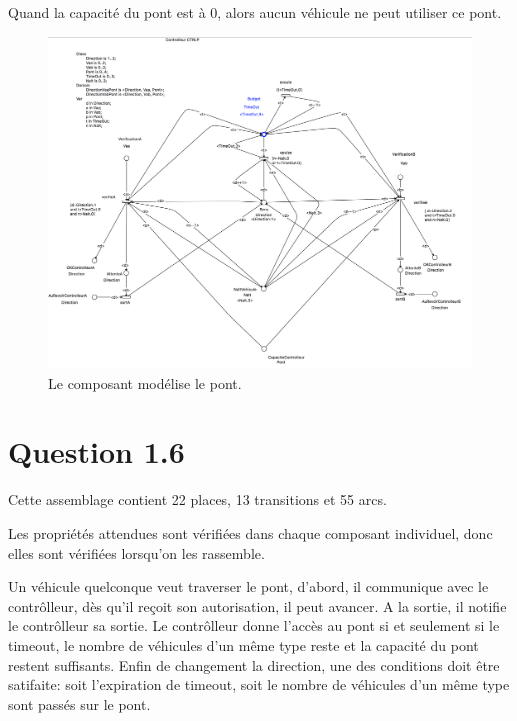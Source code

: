\documentclass[a4paper,11pt]{report}
\begin{document}
	Quand la capacité du pont est à 0, alors aucun véhicule ne peut utiliser ce pont.

	\begin{figure}[!htbp]
		\includegraphics[width = 18cm]{ctrlpModel.png}
		\caption{Le composant modélise le pont.}
	\end{figure}
	\newpage
	
\section{Question 1.6}
	Cette assemblage contient 22 places, 13 transitions et 55$  $ arcs.
	
	Les propriétés attendues sont vérifiées dans chaque composant individuel, donc elles sont vérifiées lorsqu'on les rassemble.
	
	Un véhicule quelconque veut traverser le pont, d'abord, il communique avec le contrôlleur, dès qu'il reçoit son autorisation, il peut avancer. A la sortie, il notifie le contrôlleur sa sortie. Le contrôlleur donne l'accès au pont si et seulement si le timeout, le nombre de véhicules d'un même type reste et la capacité du pont restent suffisants. Enfin de changement la direction, une des conditions doit être satifaite: soit l'expiration de timeout, soit le nombre de véhicules d'un même type sont passés sur le pont. 
	
\end{document}
